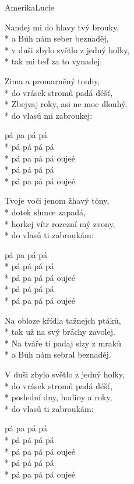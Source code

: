 \documentclass[10.5pt]{book}
\begin{document}
\begin{poem}{Amerika}{Lucie}

\settowidth{\versewidth}{v duši zbylo světlo z jedný holky,}

Nandej mi do hlavy tvý brouky,\\*
a Bůh nám seber beznaděj,\\*
v duši zbylo světlo z jedný holky,\\*
tak mi teď za to vynadej.

Zima a promarněný touhy,\\*
do vrásek stromů padá déšť,\\*
Zbejvaj roky, asi ne moc dlouhý,\\*
do vlasů mi zabroukej:

pá pa pá pá\\*
pá pá pá pá\\*
pá pa pá pá oujeé\\*
pá pá pá pá\\*
pá pa pá pá oujeé

Tvoje voči jenom žhavý tóny,\\*
dotek slunce zapadá,\\*
horkej vítr rozezní mý zvony,\\*
do vlasů ti zabroukám:

pá pa pá pá\\*
pá pá pá pá\\*
pá pa pá pá oujeé\\*
pá pá pá pá\\*
pá pa pá pá oujeé

Na obloze křídla tažnejch ptáků,\\*
tak už na svý bráchy zavolej.\\*
Na tváře ti padaj slzy z mraků\\*
a Bůh nám sebral beznaděj. 

V duši zbylo světlo z jedný holky,\\*
do vrásek stromů padá déšť,\\*
poslední dny, hodiny a roky,\\*
do vlasů ti zabroukám:

pá pa pá pá\\*
pá pá pá pá\\*
pá pa pá pá oujeé\\*
pá pá pá pá\\*
pá pa pá pá oujeé

\end{poem}
\end{document}
